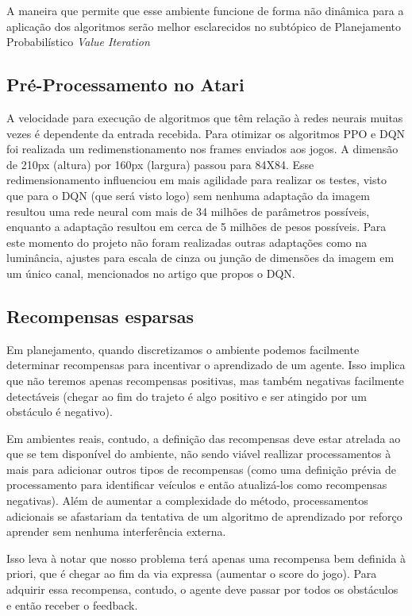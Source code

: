 \documentclass[letterpaper]{article} %
\begin{document}
A maneira que permite que esse ambiente funcione de forma não dinâmica para a aplicação dos algoritmos serão melhor esclarecidos no subtópico de Planejamento Probabilístico \textit{Value Iteration}

\subsection{Pré-Processamento no Atari}
A velocidade para execução de algoritmos que têm relação à redes neurais muitas vezes é dependente da entrada recebida. Para otimizar os algoritmos PPO e DQN foi realizada um redimenstionamento nos frames enviados aos jogos. A dimensão de 210px (altura) por 160px (largura) passou para 84X84. Esse redimensionamento influenciou em mais agilidade para realizar os testes, visto que para o DQN (que será visto logo) sem nenhuma adaptação da imagem resultou uma rede neural com mais de 34 milhões de parâmetros possíveis, enquanto a adaptação resultou em cerca de 5 milhões de pesos possíveis. Para este momento do projeto não foram realizadas outras adaptações como na luminância, ajustes para escala de cinza ou junção de dimensões da imagem em um único canal, mencionados no artigo que propos o DQN.

\subsection{Recompensas esparsas}
Em planejamento, quando discretizamos o ambiente podemos facilmente determinar recompensas para incentivar o aprendizado de um agente. Isso implica que não teremos apenas recompensas positivas, mas também negativas facilmente detectáveis (chegar ao fim do trajeto é algo positivo e ser atingido por um obstáculo é negativo).

Em ambientes reais, contudo, a definição das recompensas deve estar atrelada ao que se tem disponível do ambiente, não sendo viável reallizar processamentos à mais para adicionar outros tipos de recompensas (como uma definição prévia de processamento para identificar veículos e então atualizá-los como recompensas negativas). Além de aumentar a complexidade do método, processamentos adicionais se afastariam da tentativa de um algoritmo de aprendizado por reforço aprender sem nenhuma interferência externa.

Isso leva à notar que nosso problema terá apenas uma recompensa bem definida à priori, que é chegar ao fim da via expressa (aumentar o score do jogo). Para adquirir essa recompensa, contudo, o agente deve passar por todos os obstáculos e então receber o feedback.
\end{document}
